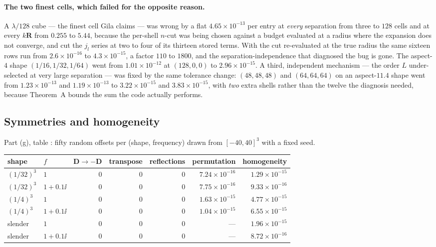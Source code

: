 \paragraph{The two finest cells, which failed for the opposite reason.} A $\lambda/128$
cube --- the finest cell Gila claims --- was wrong by a flat $4.65\times10^{-13}$ per entry
at \emph{every} separation from three to $128$ cells and at every $k\mathbf{R}$ from $0.255$
to $5.44$, because the per-shell $n$-cut was being chosen against a budget evaluated at a
radius where the expansion does not converge, and cut the $j_l$ series at two to four of its
thirteen stored terms. With the cut re-evaluated at the true radius the same sixteen rows run
from $2.6\times10^{-16}$ to $4.3\times10^{-15}$, a factor $110$ to $1800$, and the
separation-independence that diagnosed the bug is gone. The aspect-$4$ shape
$(1/16,1/32,1/64)$ went from $1.01\times10^{-12}$ at $(128,0,0)$ to $2.96\times10^{-15}$.
A third, independent mechanism --- the order $L$ under-selected at very large separation ---
was fixed by the same tolerance change: $(48,48,48)$ and $(64,64,64)$ on an aspect-$11.4$
shape went from $1.23\times10^{-13}$ and $1.19\times10^{-13}$ to $3.22\times10^{-15}$ and
$3.83\times10^{-15}$, with \emph{two} extra shells rather than the twelve the diagnosis
needed, because Theorem~A bounds the sum the code actually performs.

\subsection{Symmetries and homogeneity}
\label{sec:ver:sym}

Part (g), table : fifty random offsets per (shape, frequency) drawn from
$[-40,40]^3$ with a fixed seed.

\begin{center}\small
\begin{tabular}{@{}llrrrrr@{}}
\toprule
shape & $f$ & $\mathbf{D}\to-\mathbf{D}$ & transpose & reflections & permutation &
homogeneity\\
\midrule
$(1/32)^3$ & $1$ & 0 & 0 & 0 & $7.24\times10^{-16}$ & $1.29\times10^{-15}$\\
$(1/32)^3$ & $1+0.1\ii$ & 0 & 0 & 0 & $7.75\times10^{-16}$ & $9.33\times10^{-16}$\\
$(1/4)^3$ & $1$ & 0 & 0 & 0 & $1.63\times10^{-15}$ & $4.77\times10^{-15}$\\
$(1/4)^3$ & $1+0.1\ii$ & 0 & 0 & 0 & $1.04\times10^{-15}$ & $6.55\times10^{-15}$\\
slender & $1$ & 0 & 0 & 0 & --- & $1.96\times10^{-15}$\\
slender & $1+0.1\ii$ & 0 & 0 & 0 & --- & $8.72\times10^{-16}$\\
\bottomrule
\end{tabular}
\end{center}

